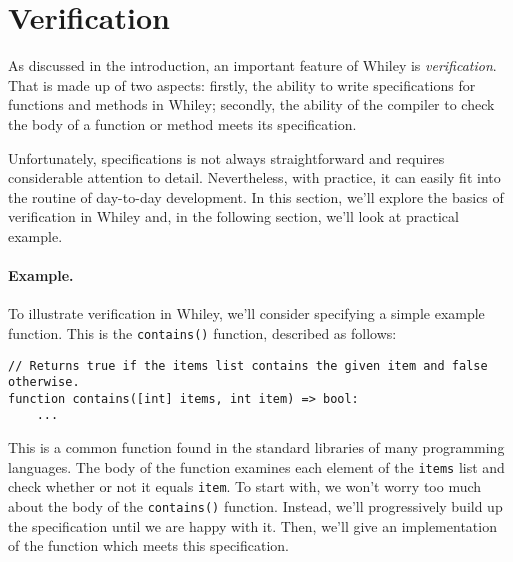 \section{Verification}

As discussed in the introduction, an important feature of Whiley is
{\em verification}.  That is made up of two aspects: firstly, the
ability to write specifications for functions and methods in Whiley;
secondly, the ability of the compiler to check the body of a function
or method meets its specification.

Unfortunately, specifications is not always straightforward and
requires considerable attention to detail.  Nevertheless, with
practice, it can easily fit into the routine of day-to-day
development.  In this section, we'll explore the basics of
verification in Whiley and, in the following section, we'll look at
practical example.

\paragraph{Example.}  To illustrate verification in Whiley, we'll
consider specifying a simple example function.  This is the
\lstinline{contains()} function, described as follows:

\begin{lstlisting}
// Returns true if the items list contains the given item and false otherwise.
function contains([int] items, int item) => bool:
    ...
\end{lstlisting}

This is a common function found in the standard libraries of many
programming languages.  The body of the function examines each element
of the \lstinline{items} list and check whether or not it equals
\lstinline{item}.  To start with, we won't worry too much about the
body of the \lstinline{contains()} function.  Instead, we'll
progressively build up the specification until we are happy with it.
Then, we'll give an implementation of the function which meets this
specification.


